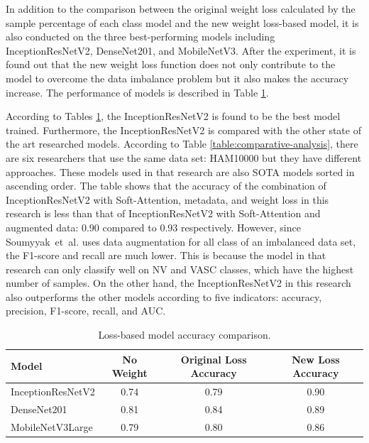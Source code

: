 \documentclass[sensors,article,accept,pdftex,moreauthors]{Definitions/mdpi}
\begin{document}
	In addition to the comparison between the original weight loss calculated by the sample percentage of each class model and the new weight loss-based model, it is also conducted on the three best-performing models including InceptionResNetV2, DenseNet201, and MobileNetV3. After the experiment, it is found out that the new weight loss function does not only contribute to the model to overcome the data imbalance problem but it also makes the accuracy increase. The performance of models is described in Table \ref{table:loss-comparision}.
	
	According to {Tables} %
	\ref{table:loss-comparision}, the InceptionResNetV2 is found to be the best model trained. Furthermore, the InceptionResNetV2 is compared with the other state of the art researched models. According to Table \ref{table:comparative-analysis}, there are six researchers that use the same data set: HAM10000 but they have  different approaches. These models used in that research are also SOTA models sorted in ascending order. The table shows that the accuracy of the combination of InceptionResNetV2 with Soft-Attention, metadata, and weight loss in this research is less than that of InceptionResNetV2 with Soft-Attention and augmented data: 0.90 compared to 0.93 respectively. However, since Soumyyak~et~al. uses data augmentation for all class of an imbalanced data set, the F1-score and recall are much lower. This is because the model in that research can only classify well on NV and VASC classes, which have the highest number of samples. On the other hand, the InceptionResNetV2 in this research also outperforms the other models according to five indicators: accuracy, precision, F1-score, recall, and AUC. 
	\begin{table}[H]
			\caption{Loss-based model accuracy comparison.}
		\label{table:loss-comparision}
	\setlength{\tabcolsep}{2.8mm}\begin{tabular}{ l  c  c  c }
\toprule
\textbf{Model} & \textbf{No Weight} & \textbf{Original Loss Accuracy} & \textbf{New Loss Accuracy}\\
\midrule
InceptionResNetV2 & 0.74 & 0.79 & 0.90\\
DenseNet201 & 0.81 & 0.84 & 0.89\\
MobileNetV3Large & 0.79 & 0.80 & 0.86\\
\bottomrule
		\end{tabular}
	\end{table} 
\unskip
\end{document}
